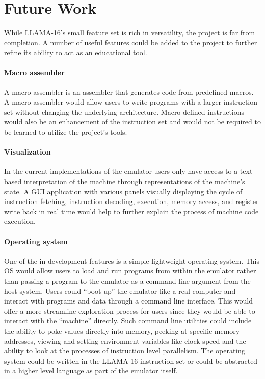 \documentclass[man,hidelinks,floatsintext]{apa7}
\begin{document}
\section{Future Work}
\label{sec:futurework}
While LLAMA-16's small feature set is rich in versatility, the project is far from completion. A number of useful features could be added to the project to further refine its ability to act as an educational tool.
\paragraph{Macro assembler}
A macro assembler is an assembler that generates code from predefined macros. A macro assembler would allow users to write programs with a larger instruction set without changing the underlying architecture. Macro defined instructions would also be an enhancement of the instruction set and would not be required to be learned to utilize the project's tools.
\paragraph{Visualization}
In the current implementations of the emulator users only have access to a text based interpretation of the machine through representations of the machine's state. A GUI application with various panels visually displaying the cycle of instruction fetching, instruction decoding, execution, memory access, and register write back in real time would help to further explain the process of machine code execution.
\paragraph{Operating system}
\label{sec:os}
One of the in development features is a simple lightweight operating system. This OS would allow users to load and run programs from within the emulator rather than passing a program to the emulator as a command line argument from the host system. Users could ``boot-up'' the emulator like a real computer and interact with programs and data through a command line interface. This would offer a more streamline exploration process for users since they would be able to interact with the ``machine'' directly. Such command line utilities could include the ability to poke values directly into memory, peeking at specific memory addresses, viewing and setting environment variables like clock speed and the ability to look at the processes of instruction level parallelism. The operating system could be written in the LLAMA-16 instruction set or could be abstracted in a higher level language as part of the emulator itself.
\printbibliography
\end{document}
